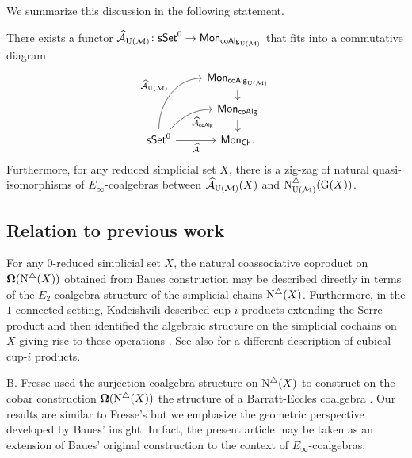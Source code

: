 We summarize this discussion in the following statement.

\begin{theorem} \label{t:2nd main thm in the intro} There exists a functor $\operatorname{\mathcal{\widehat{A}}}_{\operatorname{U}(\mathcal{M})} \colon \mathsf{sSet}^0 \to \mathsf{Mon}_{\mathsf{coAlg}_{\operatorname{U}(\mathcal{M})}}$ that fits into a commutative diagram
	\[
	\begin{tikzcd}[row sep=small]
	& \Mon_{\coAlg_\UM} \arrow[d] \\
	& \Mon_{\coAlg} \arrow[d] \\
	\sSet^0
	\arrow[r, "\Ahat"', ]
	\arrow[ru, "\Ahat_{\coAlg}"', out=45, in=180] 
	\arrow[ruu, "\Ahat_\UM", out=90, in=180]
	& \Mon_{\Ch}.
	\end{tikzcd}
	\]
	Furthermore, for any reduced simplicial set $X$, there is a zig-zag of natural quasi-isomorphisms of $E_{\infty}$-coalgebras between $\operatorname{\mathcal{\widehat{A}}}_{\operatorname{U}(\mathcal{M})}(X)$ and $\operatorname{N^{\triangle}_{{\operatorname{U}(\mathcal{M})}}}(\operatorname{G}(X))$.
\end{theorem}

\subsection*{Relation to previous work}

For any $0$-reduced simplicial set $X$, the natural coassociative coproduct on $\operatorname{\mathbf{\Omega}} (\operatorname{N^{\triangle}} (X))$ obtained from Baues construction may be described directly in terms of the $E_2$-coalgebra structure of the simplicial chains $\operatorname{N^{\triangle}}(X)$.
Furthermore, in the $1$-connected setting, Kadeishvili described cup-$i$ products extending the Serre product and then identified the algebraic structure on the simplicial cochains on $X$ giving rise to these operations \cite{kadeishvili1999coproducts, kadeishvili2003cup-i}.
See also \cite{pilarczyk2016cubical} for a different description of cubical cup-$i$ products.

B. Fresse used the surjection coalgebra structure on $\operatorname{N^{\triangle}}(X)$ to construct on the cobar construction $\operatorname{\mathbf{\Omega}}(\operatorname{N^{\triangle}}(X))$ the  structure of a Barratt-Eccles coalgebra \cite{fresse2003hopf}.
Our results are similar to Fresse's but we emphasize the geometric perspective developed by Baues' insight.
In fact, the present article may be taken as an extension of Baues' original construction to the context of $E_{\infty}$-coalgebras.


